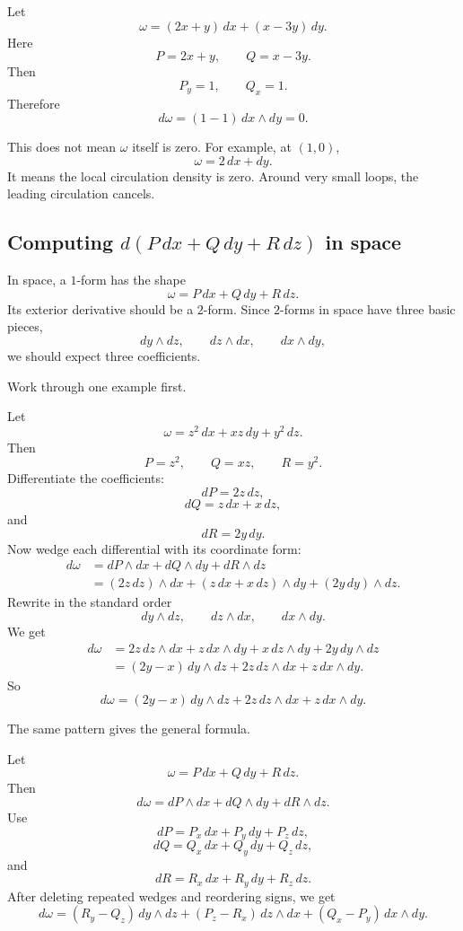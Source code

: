 \begin{example}
Let
\[
    \omega=(2x+y)\,dx+(x-3y)\,dy.
\]
Here
\[
    P=2x+y,
    \qquad
    Q=x-3y.
\]
Then
\[
    P_y=1,
    \qquad
    Q_x=1.
\]
Therefore
\[
    d\omega=(1-1)\,dx\wedge dy=0.
\]

This does not mean \(\omega\) itself is zero.  For example, at \((1,0)\),
\[
    \omega=2\,dx+dy.
\]
It means the local circulation density is zero.  Around very small loops, the leading
circulation cancels.
\end{example}

\subsection{Computing \texorpdfstring{\(d(P\,dx+Q\,dy+R\,dz)\)}%
{d(P dx + Q dy + R dz)} in space}

In space, a \(1\)-form has the shape
\[
    \omega=P\,dx+Q\,dy+R\,dz.
\]
Its exterior derivative should be a \(2\)-form.  Since \(2\)-forms in space have three
basic pieces,
\[
    dy\wedge dz,\qquad dz\wedge dx,\qquad dx\wedge dy,
\]
we should expect three coefficients.

Work through one example first.

Let
\[
    \omega=z^2\,dx+xz\,dy+y^2\,dz.
\]
Then
\[
    P=z^2,
    \qquad
    Q=xz,
    \qquad
    R=y^2.
\]
Differentiate the coefficients:
\[
    dP=2z\,dz,
\]
\[
    dQ=z\,dx+x\,dz,
\]
and
\[
    dR=2y\,dy.
\]
Now wedge each differential with its coordinate form:
\[
\begin{aligned}
    d\omega
    &=
    dP\wedge dx+dQ\wedge dy+dR\wedge dz\\
    &=
    (2z\,dz)\wedge dx
    +
    (z\,dx+x\,dz)\wedge dy
    +
    (2y\,dy)\wedge dz.
\end{aligned}
\]
Rewrite in the standard order
\[
    dy\wedge dz,\qquad dz\wedge dx,\qquad dx\wedge dy.
\]
We get
\[
\begin{aligned}
    d\omega
    &=
    2z\,dz\wedge dx
    +
    z\,dx\wedge dy
    +
    x\,dz\wedge dy
    +
    2y\,dy\wedge dz\\
    &=
    (2y-x)\,dy\wedge dz
    +
    2z\,dz\wedge dx
    +
    z\,dx\wedge dy.
\end{aligned}
\]
So
\[
\boxed{
    d\omega
    =
    (2y-x)\,dy\wedge dz
    +
    2z\,dz\wedge dx
    +
    z\,dx\wedge dy.
}
\]

The same pattern gives the general formula.

Let
\[
    \omega=P\,dx+Q\,dy+R\,dz.
\]
Then
\[
    d\omega=dP\wedge dx+dQ\wedge dy+dR\wedge dz.
\]
Use
\[
    dP=P_x\,dx+P_y\,dy+P_z\,dz,
\]
\[
    dQ=Q_x\,dx+Q_y\,dy+Q_z\,dz,
\]
and
\[
    dR=R_x\,dx+R_y\,dy+R_z\,dz.
\]
After deleting repeated wedges and reordering signs, we get
\[
\boxed{
    d\omega
    =
    (R_y-Q_z)\,dy\wedge dz
    +
    (P_z-R_x)\,dz\wedge dx
    +
    (Q_x-P_y)\,dx\wedge dy.
}
\]


